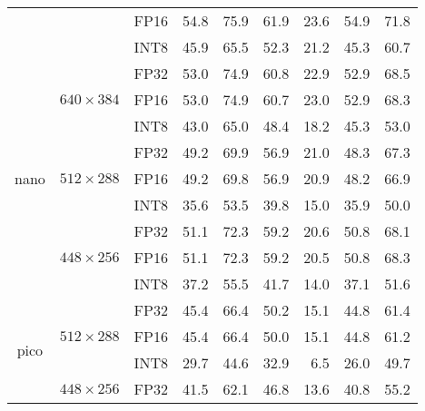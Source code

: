 \begin{appendices}
\begin{table}[t]
\begin{threeparttable}
\begin{tabular}{|c|c|c|rrrrrr|}
                                        &                                  & FP16 & 54.8 & 75.9 & 61.9 & 23.6 & 54.9 & 71.8 \\
                                        &                                  & INT8 & 45.9 & 65.5 & 52.3 & 21.2 & 45.3 & 60.7 \\
            \hline                      
            \multirow{9}{*}{nano}       & \multirow{3}{*}{$640\times384$}  & FP32 & 53.0 & 74.9 & 60.8 & 22.9 & 52.9 & 68.5 \\
                                        &                                  & FP16 & 53.0 & 74.9 & 60.7 & 23.0 & 52.9 & 68.3 \\
                                        &                                  & INT8 & 43.0 & 65.0 & 48.4 & 18.2 & 45.3 & 53.0 \\
            \cline{2-9}
                                        & \multirow{3}{*}{$512\times288$}  & FP32 & 49.2 & 69.9 & 56.9 & 21.0 & 48.3 & 67.3 \\
                                        &                                  & FP16 & 49.2 & 69.8 & 56.9 & 20.9 & 48.2 & 66.9 \\
                                        &                                  & INT8 & 35.6 & 53.5 & 39.8 & 15.0 & 35.9 & 50.0 \\
            \cline{2-9}
                                        & \multirow{3}{*}{$448\times256$}  & FP32 & 51.1 & 72.3 & 59.2 & 20.6 & 50.8 & 68.1 \\
                                        &                                  & FP16 & 51.1 & 72.3 & 59.2 & 20.5 & 50.8 & 68.3 \\
                                        &                                  & INT8 & 37.2 & 55.5 & 41.7 & 14.0 & 37.1 & 51.6 \\
            \hline
            \multirow{9}{*}{pico}       & \multirow{3}{*}{$512\times288$}  & FP32 & 45.4 & 66.4 & 50.2 & 15.1 & 44.8 & 61.4 \\
                                        &                                  & FP16 & 45.4 & 66.4 & 50.0 & 15.1 & 44.8 & 61.2 \\
                                        &                                  & INT8 & 29.7 & 44.6 & 32.9 &  6.5 & 26.0 & 49.7 \\
            \cline{2-9}
                                        & \multirow{3}{*}{$448\times256$}  & FP32 & 41.5 & 62.1 & 46.8 & 13.6 & 40.8 & 55.2 \\

\end{tabular}
\end{threeparttable}
\end{table}
\end{appendices}
